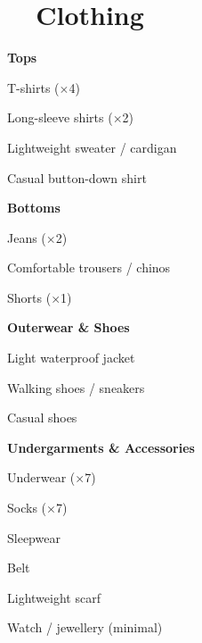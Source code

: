 \section{\faTshirt\ \ Clothing}

{\color{accent}\bfseries Tops}
\begin{checklist}
  \item T-shirts ($\times$4)
  \item Long-sleeve shirts ($\times$2)
  \item Lightweight sweater / cardigan
  \item Casual button-down shirt
\end{checklist}

{\color{accent}\bfseries Bottoms}
\begin{checklist}
  \item Jeans ($\times$2)
  \item Comfortable trousers / chinos
  \item Shorts ($\times$1)
\end{checklist}

{\color{accent}\bfseries Outerwear \& Shoes}
\begin{checklist}
  \item Light waterproof jacket
  \item Walking shoes / sneakers
  \item Casual shoes
\end{checklist}

{\color{accent}\bfseries Undergarments \& Accessories}
\begin{checklist}
  \item Underwear ($\times$7)
  \item Socks ($\times$7)
  \item Sleepwear
  \item Belt
  \item Lightweight scarf
  \item Watch / jewellery (minimal)
\end{checklist}

